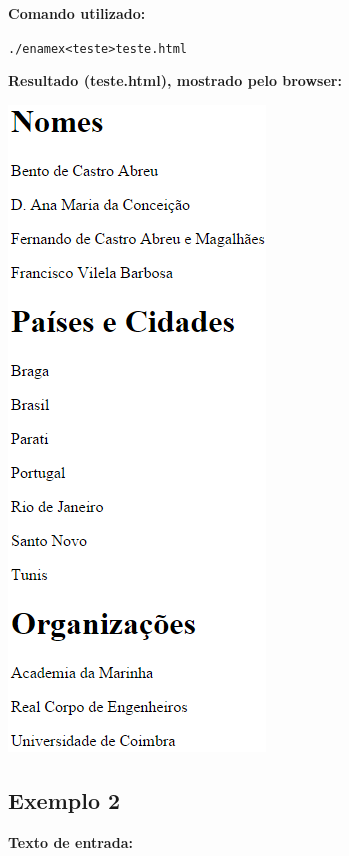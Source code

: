 \documentclass[11pt,a4paper]{article}
\begin{document}
\textbf{Comando utilizado:}

\begin{alltt}
./enamex < teste > teste.html
\end{alltt}

\textbf{Resultado (teste.html), mostrado pelo browser:}

\includegraphics[scale=0.84]{html.png}

\subsection*{Exemplo 2}

\textbf{Texto de entrada:}
\end{document}
